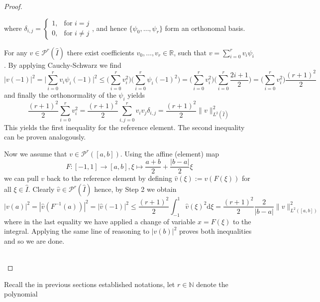 \begin{proof}
\begin{proofstep}[Setup]
\[        \]
        where $\delta_{i,j} = 
        \begin{cases}
            1, &\text{for } i = j\\
            0, &\text{for } i\neq j   
        \end{cases}$, and hence $\{\psi_0,\ldots,\psi_r\}$ form an orthonomal basis.
    \end{proofstep} 
    \begin{proofstep}
        For any $v\in \mathcal{P}^r(\hat{I})$
        there exist coefficients $v_0,\ldots,v_r \in \mathbb{R}$, such that 
        $v = \sum_{i=0}^{r}v_i \psi_i$. By applying Cauchy-Schwarz we find
        \[
            |v(-1)|^2 = \Big|\sum_{i=0}^{r}v_i \psi_i(-1)\Big|^2 \leq \Big(\sum_{i=0}^{r} v_i^2 \Big)\Big(\sum_{i=0}^{r} \psi_i(-1)^2 \Big)
            = \Big(\sum_{i=0}^{r} v_i^2 \Big)\Big(\sum_{i=0}^{r} \frac{2i+1}{2} \Big)
            = \Big(\sum_{i=0}^{r} v_i^2 \Big)\frac{(r+1)^2}{2}
        \]
        and finally the orthonormality of the $\psi_i$ yields
        \[
            \frac{(r+1)^2}{2}\sum_{i=0}^{r} v_i^2  = \frac{(r+1)^2}{2}\sum_{i,j=0}^{r} v_i v_j \delta_{i,j}
            = \frac{(r+1)^2}{2} \|v\|_{L^2(\hat{I})}^2
        \]
        This yields the first inequality for the reference element. The second inequality
        can be proven analogously.
    \end{proofstep} 
    \begin{proofstep}
        Now we assume that $v \in \mathcal{P}^r([a,b])$.
        Using the affine (element) map 
        \[
            F:[-1,1] \to [a,b], \xi \mapsto \frac{a + b}{2} + \frac{|b-a|}{2}\xi
        \] 
        we can pull $v$ back to the reference element by defining
        $\widehat{v}(\xi):=v(F(\xi))$ for all $\xi \in \hat{I}$.
        Clearly $\widehat{v} \in \mathcal{P}^r(\hat{I})$ hence, by Step 2 we obtain
        \[
            |v(a)|^2 = |\widehat{v}(F^{-1}(a))|^2 = |\widehat{v}(-1)|^2 
            \leq \frac{(r+1)^2}{2}\int_{-1}^{1}\widehat{v}(\xi)^2 \text{d}\xi =
            \frac{(r+1)^2}{2}\frac{2}{|b-a|}\|v\|_{L^2([a,b])}^2 
        \] 
        where in the last equality we have applied a change of variable $x=F(\xi)$ to the integral.
        Applying the same line of reasoning to $|v(b)|^2$ proves both inequalities
        and so we are done.
    \end{proofstep}
    \\
\end{proof}
\medskip
Recall the in previous sections established notations, let $r\in \mathbb{N}$ denote the polynomial 
